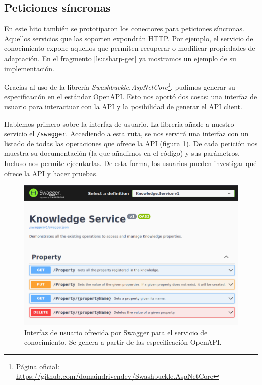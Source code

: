 \subsection{Peticiones síncronas}

En este hito también se prototiparon los conectores para peticiones síncronas. Aquellos servicios que las soporten expondrán  HTTP. Por ejemplo, el servicio de conocimiento expone aquellos que permiten recuperar o modificar propiedades de adaptación.  En el fragmento \ref{ls:csharp-get} ya mostramos un ejemplo de su implementación.

Gracias al uso de la librería \emph{Swashbuckle.AspNetCore}\footnote{Página oficial: \url{https://github.com/domaindrivendev/Swashbuckle.AspNetCore}}, pudimos generar su especificación en el estándar OpenAPI. Esto nos aportó dos cosas: una interfaz de usuario para interactuar con la API y la posibilidad de generar el API client.

Hablemos primero sobre la interfaz de usuario. La librería añade a nuestro servicio el  \texttt{/swagger}. Accediendo a esta ruta, se nos servirá una interfaz con un listado de todas las operaciones que ofrece la API (figura \ref{fig:swagger-knowledge-ui}). De cada petición nos muestra su documentación (la que añadimos en el código) y sus parámetros. Incluso nos permite ejecutarlas. De esta forma, los usuarios pueden investigar qué ofrece la API y hacer pruebas.

\begin{figure}[htb]
  \centering
  \includegraphics[scale=1.5]{cap_implementacion/images/swagger-knowledge-ui}
  \caption{Interfaz de usuario ofrecida por Swagger para el servicio de conocimiento. Se genera a partir de las especificación OpenAPI.}
  \label{fig:swagger-knowledge-ui}
\end{figure}

